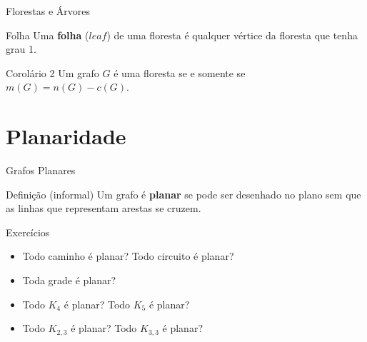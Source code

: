 \documentclass[xcolor=dvipsnames,table]{beamer}
\begin{document}
	\begin{frame}{Florestas e Árvores}
		\begin{block}{Folha}
			Uma {\bf folha} ($leaf$) de uma floresta é qualquer vértice da floresta que tenha grau 1.
		\end{block} \pause
		\begin{block}{Corolário 2}
			Um grafo $G$ é uma floresta se e somente se $m(G) = n(G) - c(G)$.
		\end{block}
	\end{frame}
	
	\section{Planaridade}
	\begin{frame}{Grafos Planares}
		\begin{block}{Definição (informal)}
			Um grafo é {\bf planar} se pode ser desenhado no plano sem que as linhas que representam arestas se cruzem.
		\end{block} \pause
		\begin{block}{Exercícios}
			\begin{itemize}
				\item Todo caminho é planar? Todo circuito é planar? \pause
				\item Toda grade é planar? \pause
				\item Todo $K_4$ é planar? Todo $K_5$ é planar? \pause
				\item Todo $K_{2,3}$ é planar? Todo $K_{3,3}$ é planar?
			\end{itemize}
		\end{block}
	\end{frame}
	
	\begin{frame}
		\titlepage
	\end{frame}
	
\end{document}
